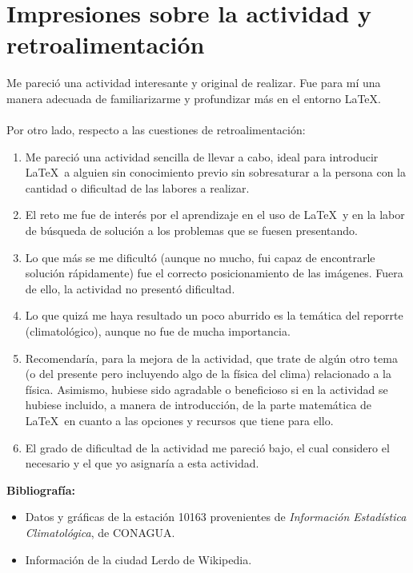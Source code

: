 \documentclass[12pt]{article}
\begin{document}
\section{Impresiones sobre la actividad y retroalimentación}

Me pareció una actividad interesante y original de realizar. Fue para mí una manera adecuada de familiarizarme y profundizar más en el entorno \LaTeX.\\\\ Por otro lado, respecto a las cuestiones de retroalimentación:
\begin{enumerate}
    \item Me pareció una actividad sencilla de llevar a cabo, ideal para introducir \LaTeX\ a alguien sin conocimiento previo sin sobresaturar a la persona con la cantidad o dificultad de las labores a realizar.
    \item El reto me fue de interés por el aprendizaje en el uso de  \LaTeX\ y en la labor de búsqueda de solución a los problemas que se fuesen presentando.
    \item Lo que más se me dificultó (aunque no mucho, fui capaz de encontrarle solución rápidamente) fue el correcto posicionamiento de las imágenes. Fuera de ello, la actividad no presentó dificultad.
    \item Lo que quizá me haya resultado un poco aburrido es la temática del reporrte (climatológico), aunque no fue de mucha importancia.
    \item Recomendaría, para la mejora de la actividad, que trate de algún otro tema (o del presente pero incluyendo algo de la física del clima) relacionado a la física. Asimismo, hubiese sido agradable o beneficioso si en la actividad se hubiese incluido, a manera de introducción, de la parte matemática de \LaTeX\ en cuanto a las opciones y recursos que tiene para ello.
    \item El grado de dificultad de la actividad me pareció bajo, el cual considero el necesario y el que yo asignaría a esta actividad.
\end{enumerate}
\clearpage
\textbf{\Large{Bibliografía:}}
\begin{itemize}
    \item Datos y gráficas de la estación 10163 provenientes de \textit{Información Estadística Climatológica}, de CONAGUA.
    \item Información de la ciudad Lerdo de Wikipedia.
\end{itemize}
\end{document}
